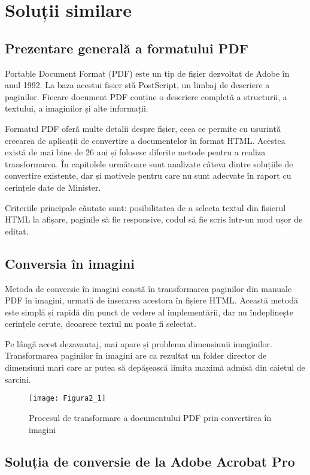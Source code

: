 \chapter{Soluții similare}
\section{Prezentare generală a formatului PDF}

Portable Document Format (PDF) este un tip de fișier dezvoltat de Adobe în anul 1992. La baza acestui fișier stă PostScript, un limbaj de descriere a paginilor. Fiecare document PDF conține o descriere completă a structurii, a textului, a imaginilor și alte informații.

Formatul PDF oferă multe detalii despre fișier, ceea ce permite cu ușurință creearea de aplicații de convertire a documentelor în format HTML. Acestea există de mai bine de 26 ani \cite{kieninger1998paper} și folosesc diferite metode pentru a realiza transformarea. În capitolele următoare sunt analizate câteva dintre soluțiile de convertire existente, dar și motivele pentru care nu sunt adecvate în raport cu cerințele date de Minister.

Criteriile principale căutate sunt: posibilitatea de a selecta textul din fișierul HTML la afișare, paginile să fie responsive, codul să fie scris într-un mod ușor de editat.


\section{Conversia în imagini}

Metoda de conversie în imagini constă în transformarea paginilor din manuale PDF în imagini, urmată de inserarea acestora în fișiere HTML. Această metodă este simplă și rapidă din punct de vedere al implementării, dar nu îndeplinește cerințele cerute, deoarece textul nu poate fi selectat.

Pe lângă acest dezavantaj, mai apare și problema dimensiunii imaginilor. Transformarea paginilor în imagini are ca rezultat un folder director de dimensiuni mari care ar putea să depășească limita maximă admisă din caietul de sarcini.
\begin{figure}[H]
	\centering
	\texttt{[image: Figura2\_1]}
	\caption{Procesul de transformare a documentului PDF prin convertirea în imagini}
	\label{fig:Figura2_1}
\end{figure}


\section{Soluția de conversie de la Adobe Acrobat Pro}

